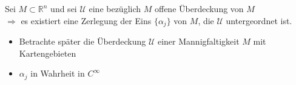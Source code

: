 \begin{proposition}
	Sei $M\subset\mathbb{R}^n$ und sei $\mathcal{U}$ eine bezüglich $M$ offene Überdeckung von $M$\\
	\hspace*{0.5em}$\Rightarrow$ es existiert eine Zerlegung der Eins $\{\alpha_j\}$ von $M$, die $\mathcal{U}$ untergeordnet ist.
\end{proposition}
\begin{remark}\hspace*{0.5em}
	\vspace*{-1.5em}
	\begin{itemize}
		\item Betrachte später die Überdeckung $\mathcal{U}$ einer Mannigfaltigkeit $M$ mit Kartengebieten
		\item $\alpha_j$ in Wahrheit in $C^\infty$
	\end{itemize}
\end{remark}

